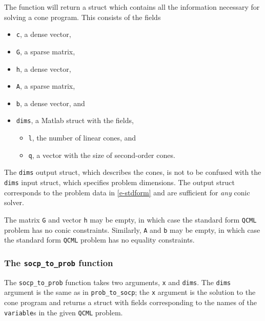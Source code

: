 \documentclass[11pt]{article}
\def\qcml{\texttt{QCML}\xspace}
\begin{document}
The function will return a struct which contains all the information
necessary for solving a cone program. This consists of the fields
\begin{itemize}
  \item {\tt c}, a dense vector,
  \item {\tt G}, a sparse matrix,
  \item {\tt h}, a dense vector,
  \item {\tt A}, a sparse matrix,
  \item {\tt b}, a dense vector, and
  \item {\tt dims}, a Matlab struct with the fields,
  \begin{itemize}
    \item {\tt l}, the number of linear cones, and
    \item {\tt q}, a vector with the size of second-order cones.
  \end{itemize}
\end{itemize}
The {\tt dims} output struct, which describes the cones, 
is not to be confused with the {\tt dims} input 
struct, which specifies problem dimensions. 
The output struct corresponds to the problem data in \eqref{e-stdform}
and are sufficient for \emph{any} conic solver.

The matrix {\tt G} and vector {\tt h} may be empty, in which case the
standard form \qcml problem has no conic constraints. Similarly, {\tt A} and
{\tt b} may be empty, in which case the standard form \qcml problem has no
equality constraints.

\subsubsection{The {\tt socp\_to\_prob} function}
The {\tt socp\_to\_prob} function takes two arguments, {\tt x} and {\tt dims}.
The {\tt dims} argument is the same as in {\tt prob\_to\_socp}; the {\tt x}
argument is
the solution to the cone program and returns a struct with fields
corresponding to the names of the {\tt variable}s in the given \qcml problem.
\end{document}
